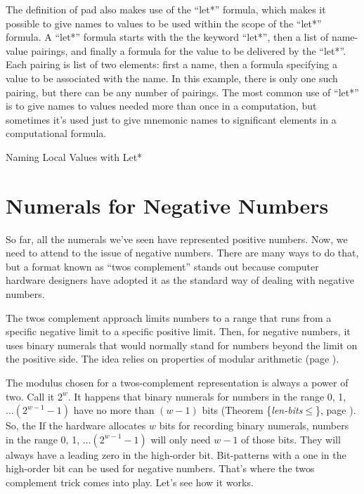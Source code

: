 
\begin{aside}
The definition of pad also makes use of the ``let*'' formula,
which makes it possible to give names to values
to be used within the scope of the ``let*'' formula.
A ``let*'' formula starts with the the keyword ``let*'',
then a list of name-value pairings, and finally
a formula for the value to be delivered by the ``let*''.
Each pairing is list of two elements: first a name,
then a formula specifying a value to be associated with the name.
In this example, there is only one such pairing,
but there can be any number of pairings.
The most common use of ``let*'' is to give names
to values needed more than once in a computation,
but sometimes it's used just to give mnemonic names
to significant elements in a computational formula.
\caption{Naming Local Values with Let*}
\label{let*-def}
\end{aside}


\section{Numerals for Negative Numbers}
\label{sec:negative-numerals}

So far, all the numerals we've seen have represented positive numbers.
Now, we need to attend to the issue of negative numbers.
There are many ways to do that,
but a format known as ``twos complement'' stands out
because computer hardware designers have adopted it
as the standard way of dealing with negative numbers.

The twos complement approach limits numbers to a range that runs
from a specific negative limit to a specific positive limit.
Then, for negative numbers, it uses binary numerals that would
normally stand for numbers beyond the limit on the positive side.
The idea relies on properties of modular arithmetic
(page \pageref{modular-arithmetic}).

The modulus chosen for a twos-complement representation
is always a power of two. Call it $2^w$.
It happens that binary numerals for numbers in the range 0, 1, $\dots (2^{w-1}-1)$
have no more than $(w-1)$ bits (Theorem \{\emph{len-bits}$\le$\}, page \pageref{len-bitsLE}).
So, the
If the hardware allocates $w$ bits for recording binary numerals,
numbers in the range 0, 1, $\dots (2^{w-1}-1)$ will
only need $w-1$ of those bits.
They will always have a leading zero in the high-order bit.
Bit-patterns with a one in the high-order bit can be used for negative numbers.
That's where the twos complement trick comes into play.
Let's see how it works.

